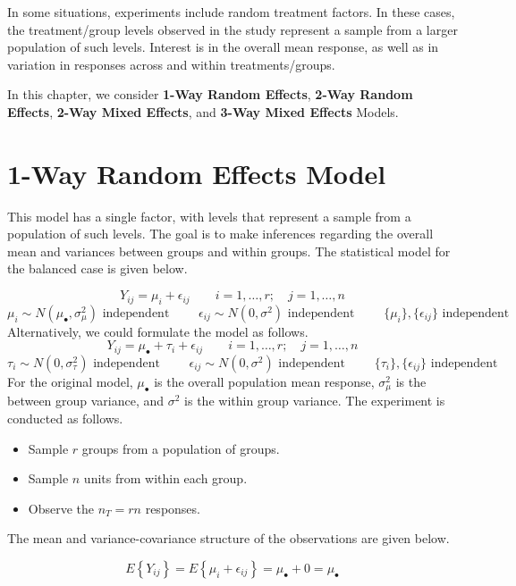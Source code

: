 \documentclass[
]{book}
\providecommand{\tightlist}{%
  \setlength{\itemsep}{0pt}\setlength{\parskip}{0pt}}
\begin{document}
In some situations, experiments include random treatment factors. In
these cases, the treatment/group levels observed in the study represent
a sample from a larger population of such levels. Interest is in the
overall mean response, as well as in variation in responses across and
within treatments/groups.

In this chapter, we consider \textbf{1-Way Random Effects},
\textbf{2-Way Random Effects}, \textbf{2-Way Mixed Effects}, and
\textbf{3-Way Mixed Effects} Models.

\section{1-Way Random Effects Model}\label{way-random-effects-model}

This model has a single factor, with levels that represent a sample from
a population of such levels. The goal is to make inferences regarding
the overall mean and variances between groups and within groups. The
statistical model for the balanced case is given below.

\[
Y_{ij} = \mu_i + \epsilon_{ij} \qquad i=1,\ldots,r;\quad j=1,\ldots,n
\] \[
\mu_i \sim N\left(\mu_{\bullet},\sigma_{\mu}^2\right) \mbox{ independent }
\qquad
\epsilon_{ij} \sim N\left(0,\sigma^2\right) \mbox{ independent }
\qquad \{\mu_i\},\{\epsilon_{ij}\} \mbox{ independent }
\] Alternatively, we could formulate the model as follows. \[
Y_{ij} = \mu_{\bullet} + \tau_i + \epsilon_{ij} \qquad i=1,\ldots,r;\quad j=1,\ldots,n
\] \[
\tau_i \sim N\left(0,\sigma_{\tau}^2\right) \mbox{ independent }
\qquad
\epsilon_{ij} \sim N\left(0,\sigma^2\right) \mbox{ independent }
\qquad \{\tau_i\},\{\epsilon_{ij}\} \mbox{ independent }
\] For the original model, \(\mu_{\bullet}\) is the overall population
mean response, \(\sigma_{\mu}^2\) is the between group variance, and
\(\sigma^2\) is the within group variance. The experiment is conducted
as follows.

\begin{itemize}
\tightlist
\item
  Sample \(r\) groups from a population of groups.
\item
  Sample \(n\) units from within each group.
\item
  Observe the \(n_T=rn\) responses.
\end{itemize}

The mean and variance-covariance structure of the observations are given
below.

\[
E\left\{Y_{ij}\right\}=E\left\{\mu_i+\epsilon_{ij}\right\}=\mu_{\bullet}+0=\mu_{\bullet}
\]
\end{document}
